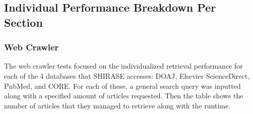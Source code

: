 \documentclass[12pt]{article}
\begin{document}
	\subsection{Individual Performance Breakdown Per Section}
	\subsubsection{Web Crawler}
	The web crawler tests focused on the individualized retrieval performance for each of the 4 databases that SHIRASE accesses: DOAJ, Elsevier ScienceDirect, PubMed, and CORE. For each of these, a general search query was inputted along with a specified amount of articles requested. Then the table shows the number of articles that they managed to retrieve along with the runtime.
	
\end{document}
